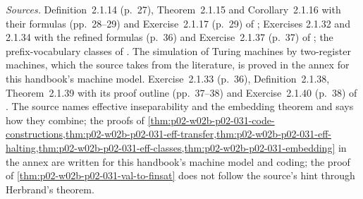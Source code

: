 \emph{Sources.}  Definition~2.1.14 (p.~27), Theorem~2.1.15 and
Corollary~2.1.16 with their formulas (pp.~28--29) and Exercise~2.1.17
(p.~29) of \cite[Sect.~2.1.1]{BorgerGradelGurevich1997}; Exercises 2.1.32 and
2.1.34 with the refined formulas (p.~36) and Exercise~2.1.37 (p.~37) of
\cite[Sect.~2.1.2]{BorgerGradelGurevich1997}; the prefix-vocabulary classes of
\cite[Sect.~1.3, Def.~1.3.1, p.~8]{BorgerGradelGurevich1997}.  The simulation
of Turing machines by two-register machines, which the source takes from the
literature, is proved in the annex for this handbook's machine model.
Exercise~2.1.33 (p.~36), Definition~2.1.38, Theorem~2.1.39
with its proof outline (pp.~37--38) and Exercise~2.1.40 (p.~38) of
\cite[Sect.~2.1.2]{BorgerGradelGurevich1997}.  The source names effective
inseparability and the embedding theorem and says how they combine; the
proofs of \cref{thm:p02-w02b-p02-031-code-constructions,thm:p02-w02b-p02-031-eff-transfer,thm:p02-w02b-p02-031-eff-halting,thm:p02-w02b-p02-031-eff-classes,thm:p02-w02b-p02-031-embedding}
in the annex are written for this handbook's machine model and coding; the proof of
\cref{thm:p02-w02b-p02-031-val-to-finsat} does not follow the source's hint
through Herbrand's theorem.
